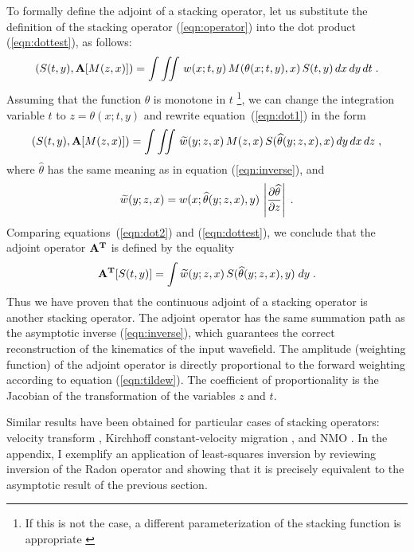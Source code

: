 \par
To formally define the adjoint of a stacking operator, 
let us substitute the definition of the stacking
operator (\ref{eqn:operator}) into the dot product
(\ref{eqn:dottest}), as follows:
\begin{equation}
\left(S(t,y),{\bf A}[M(z,x)]\right) =
\int\iint\,w(x;t,y)\,M(\theta(x;t,y),x)\,S(t,y)\,dx\,dy\,dt\;.
\label{eqn:dot1}
\end{equation}
Assuming that the function $\theta$ is monotone in $t$
\footnote{If this is not
  the case, a different parameterization of the stacking function is
  appropriate \cite[]{antial}}, we can change the integration variable $t$ to
$z=\theta(x;t,y)$ and rewrite equation~(\ref{eqn:dot1}) in the form
\begin{equation}
\left(S(t,y),{\bf A}[M(z,x)]\right) =
\int\iint\,\widetilde{w}(y;z,x)\,M(z,x)\,
S(\widehat{\theta}(y;z,x),x)\,dy\,dx\,dz\;,
\label{eqn:dot2}
\end{equation}
where $\widehat{\theta}$ has the same meaning as in equation
(\ref{eqn:inverse}), and
\begin{equation}
\widetilde{w}(y;z,x) = w(x;\widehat{\theta}(y;z,x),y)\,
\left|\partial \widehat{\theta} \over \partial z\right|\;.
\label{eqn:tildew}
\end{equation}
Comparing equations~(\ref{eqn:dot2}) and (\ref{eqn:dottest}), we conclude that the adjoint
operator ${\bf A^{T}}$ is defined by the equality
\begin{equation}
{\bf A^{T}}[S(t,y)]=
\int \widetilde{w}(y;z,x)\,S(\widehat{\theta}(y;z,x),y)\;dy\;.
\label{eqn:adjoint}
\end{equation}
Thus we have proven that the continuous adjoint of a
stacking operator is another stacking operator. The adjoint operator
has the same summation path as the asymptotic inverse (\ref{eqn:inverse}),
which guarantees the correct reconstruction of the kinematics of the
input wavefield. The amplitude (weighting function) of the adjoint
operator is directly proportional to the forward weighting according
to equation (\ref{eqn:tildew}). The coefficient of proportionality is the
Jacobian of the transformation of the variables $z$ and $t$.
\par
Similar results have been obtained for particular cases of stacking
operators: velocity transform
\cite[]{Thorson.sepphd.39,Jedlicka.sep.61.41}, Kirchhoff
constant-velocity migration \cite[]{Ji.sep.80.499}, and NMO
\cite[]{Crawley.sep.89.207}.  In the appendix, I exemplify an
application of least-squares inversion by reviewing inversion of the
Radon operator and showing that it is precisely equivalent to the
asymptotic result of the previous section.


